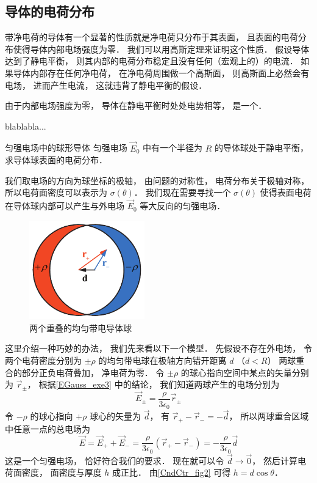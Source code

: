 
\subsection{导体的电荷分布}
带净电荷的导体有一个显著的性质就是净电荷只分布于其表面， 且表面的电荷分布使得导体内部电场强度为零． 我们可以用高斯定理来证明这个性质． 假设导体达到了静电平衡， 则其内部的电荷分布稳定且没有任何（宏观上的）的电流． 如果导体内部存在任何净电荷， 在净电荷周围做一个高斯面， 则高斯面上必然会有电场， 进而产生电流， 这就违背了静电平衡的假设．

由于内部电场强度为零， 导体在静电平衡时处处电势相等， 是一个．


blablabla...

\begin{exam}{匀强电场中的球形导体}
匀强电场 $\vec E_0$ 中有一个半径为 $R$ 的导体球处于静电平衡， 求导体球表面的电荷分布．

我们取电场的方向为球坐标的极轴， 由问题的对称性， 电荷分布关于极轴对称， 所以电荷面密度可以表示为 $\sigma(\theta)$． 我们现在需要寻找一个 $\sigma(\theta)$ 使得表面电荷在导体球内部可以产生与外电场 $\vec E_0$ 等大反向的匀强电场．

\begin{figure}[ht]
\centering
\includegraphics[width=5cm]{./figures/CndCtr1.pdf}
\caption{两个重叠的均匀带电导体球} \label{CndCtr_fig1}
\end{figure}

这里介绍一种巧妙的办法， 我们先来看以下一个模型． 先假设不存在外电场， 令两个电荷密度分别为 $\pm\rho$ 的均匀带电球在极轴方向错开距离 $d$ （$d < R$） 两球重合的部分正负电荷叠加， 净电荷为零． 令 $\pm\rho$ 的球心指向空间中某点的矢量分别为 $\vec r_\pm$， 根据\autoref{EGauss_exe3} 中的结论， 我们知道两球产生的电场分别为
\begin{equation}
\vec E_\pm = \frac{\rho}{3\epsilon_0}\vec r_\pm
\end{equation}
令 $-\rho$ 的球心指向 $+\rho$ 球心的矢量为 $\vec d$， 有 $\vec r_+ - \vec r_- = -\vec d$， 所以两球重合区域中任意一点的总电场为
\begin{equation}
\vec E = \vec E_+ + \vec E_- = \frac{\rho}{3\epsilon_0}(\vec r_+ - \vec r_-) = -\frac{\rho}{3\epsilon_0}\vec d
\end{equation}
这是一个匀强电场， 恰好符合我们的要求． 现在就可以令 $\vec d\to \vec 0$， 然后计算电荷面密度， 面密度与厚度 $h$ 成正比． 由\autoref{CndCtr_fig2} 可得 $h = d\cos\theta$．


\end{exam}
